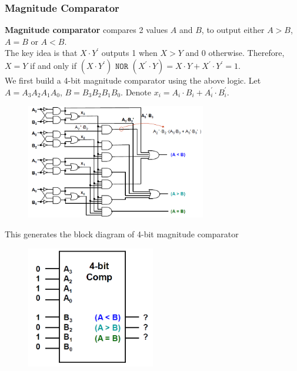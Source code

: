 \documentclass[12pt]{article}
\theoremstyle{definition}
\begin{document}
\subsubsection{Magnitude Comparator}
\textbf{Magnitude comparator} compares 2 values $A$ and $B$, to output either $A>B$, $A=B$ or $A<B$.\\The key idea is that $X\cdot Y^\prime$ outputs 1 when $X>Y$ and 0 otherwise. Therefore, $X=Y$ if and only if $(X\cdot Y^\prime)\texttt{ NOR }(X^\prime \cdot Y) = X\cdot Y + X^\prime \cdot Y^\prime= 1$.\\
We first build a 4-bit magnitude comparator using the above logic. Let $A=A_3A_2A_1A_0$, $B = B_3B_2B_1B_0$. Denote $x_i = A_i\cdot B_i + A_i^\prime\cdot B_i^\prime$.
\begin{figure}[h]
\centering
\includegraphics[width = 0.7\textwidth]{6_10.png}
\end{figure}
This generates the block diagram of 4-bit magnitude comparator
\begin{figure}[h]
\centering
\includegraphics[width = 0.5\textwidth]{6_11.png}
\end{figure}
\end{document}
